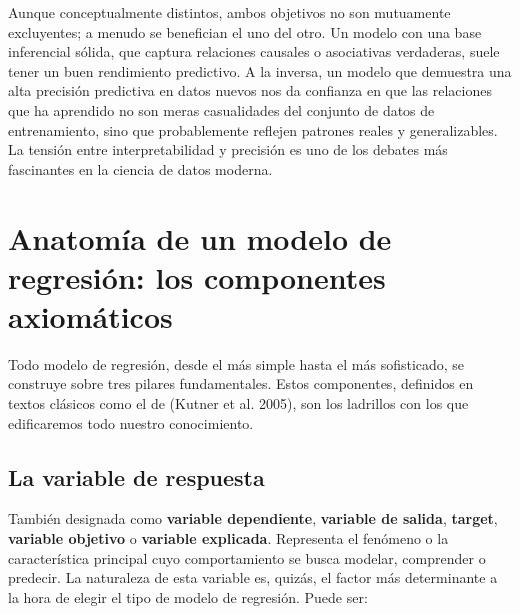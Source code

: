 \documentclass[
  letterpaper,
  DIV=11,
  numbers=noendperiod]{scrreprt}
\begin{document}
\begin{tcolorbox}[enhanced jigsaw, breakable, toprule=.15mm, bottomtitle=1mm, coltitle=black, colbacktitle=quarto-callout-important-color!10!white, titlerule=0mm, opacitybacktitle=0.6, bottomrule=.15mm, toptitle=1mm, title=\textcolor{quarto-callout-important-color}{\faExclamation}\hspace{0.5em}{Una relación simbiótica}, arc=.35mm, rightrule=.15mm, opacityback=0, colframe=quarto-callout-important-color-frame, leftrule=.75mm, left=2mm, colback=white]

Aunque conceptualmente distintos, ambos objetivos no son mutuamente
excluyentes; a menudo se benefician el uno del otro. Un modelo con una
base inferencial sólida, que captura relaciones causales o asociativas
verdaderas, suele tener un buen rendimiento predictivo. A la inversa, un
modelo que demuestra una alta precisión predictiva en datos nuevos nos
da confianza en que las relaciones que ha aprendido no son meras
casualidades del conjunto de datos de entrenamiento, sino que
probablemente reflejen patrones reales y generalizables. La tensión
entre interpretabilidad y precisión es uno de los debates más
fascinantes en la ciencia de datos moderna.

\end{tcolorbox}

\section{Anatomía de un modelo de regresión: los componentes
axiomáticos}\label{sec-componentes}

Todo modelo de regresión, desde el más simple hasta el más sofisticado,
se construye sobre tres pilares fundamentales. Estos componentes,
definidos en textos clásicos como el de (Kutner et al. 2005), son los
ladrillos con los que edificaremos todo nuestro conocimiento.

\subsection{La variable de respuesta}\label{la-variable-de-respuesta}

También designada como \textbf{variable dependiente}, \textbf{variable
de salida}, \textbf{target}, \textbf{variable objetivo} o
\textbf{variable explicada}. Representa el fenómeno o la característica
principal cuyo comportamiento se busca modelar, comprender o predecir.
La naturaleza de esta variable es, quizás, el factor más determinante a
la hora de elegir el tipo de modelo de regresión. Puede ser:
\end{document}

